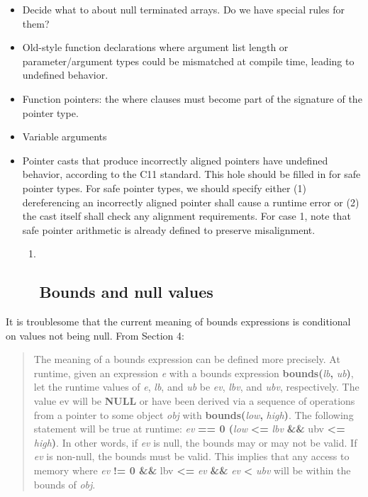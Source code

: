 \documentclass[]{article}
\begin{document}
\begin{itemize}
\item
  Decide what to about null terminated arrays. Do we have special rules
  for them?
\item
  Old-style function declarations where argument list length or
  parameter/argument types could be mismatched at compile time, leading
  to undefined behavior.
\item
  Function pointers: the where clauses must become part of the signature
  of the pointer type.
\item
  Variable arguments
\item
  Pointer casts that produce incorrectly aligned pointers have undefined
  behavior, according to the C11 standard. This hole should be filled in
  for safe pointer types. For safe pointer types, we should specify
  either (1) dereferencing an incorrectly aligned pointer shall cause a
  runtime error or (2) the cast itself shall check any alignment
  requirements. For case 1, note that safe pointer arithmetic is already
  defined to preserve misalignment.

  \begin{enumerate}
  \def\labelenumi{\arabic{enumi}.}
  \item ~
    \subsection{\texorpdfstring{\protect\hypertarget{ux5fToc437460843}{}{\protect\hypertarget{ux5fToc440445524}{}{\protect\hypertarget{ux5fToc440449306}{}{\protect\hypertarget{ux5fToc440551956}{}{\protect\hypertarget{ux5fToc426641135}{}{\protect\hypertarget{ux5fToc435435010}{}{}}}}}}Bounds
    and null
    values}{Bounds and null values}}\label{bounds-and-null-values}
  \end{enumerate}
\end{itemize}

It is troublesome that the current meaning of bounds expressions is
conditional on values not being null. From Section 4:

\begin{quote}
The meaning of a bounds expression can be defined more precisely. At
runtime, given an expression \emph{e} with a bounds expression
\textbf{bounds(}\emph{lb}\textbf{,} \emph{ub}\textbf{)}, let the runtime
values of \emph{e}, \emph{lb}, and \emph{ub} be \emph{ev}, \emph{lbv},
and \emph{ubv}, respectively. The value ev will be \textbf{NULL} or have
been derived via a sequence of operations from a pointer to some object
\emph{obj} with \textbf{bounds(}\emph{low}\textbf{,}
\emph{high}\textbf{)}. The following statement will be true at runtime:
\emph{ev} \textbf{== 0 \textbar{}\textbar{} (}\emph{low}
\textbf{\textless{}=} \emph{lbv} \textbf{\&\&} ubv \textbf{\textless{}=}
\emph{high}\textbf{)}. In other words, if \emph{ev} is null, the bounds
may or may not be valid. If \emph{ev} is non-null, the bounds must be
valid. This implies that any access to memory where \emph{ev} \textbf{!=
0 \&\&} lbv \textbf{\textless{}=} \emph{ev} \textbf{\&\&} \emph{ev}
\textbf{\textless{}} \emph{ubv} will be within the bounds of \emph{obj}.
\end{quote}
\end{document}
